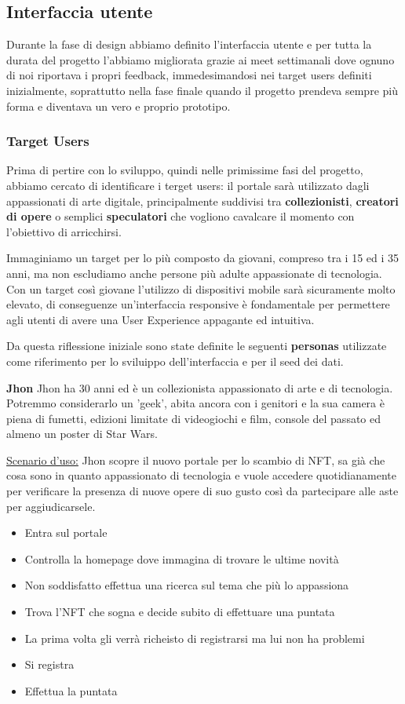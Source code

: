 \clearpage

\subsection{Interfaccia utente}
Durante la fase di design abbiamo definito l'interfaccia utente 
e per tutta la durata del progetto l'abbiamo migliorata grazie ai meet settimanali dove ognuno di noi riportava i propri feedback,
immedesimandosi nei target users definiti inizialmente,
soprattutto nella fase finale quando il progetto prendeva sempre più forma e diventava un vero e proprio prototipo.

\subsubsection{Target Users}
Prima di pertire con lo sviluppo, quindi nelle primissime fasi del progetto, abbiamo cercato di identificare i terget users:
il portale sarà utilizzato dagli appassionati di arte digitale, principalmente suddivisi tra \textbf{collezionisti}, \textbf{creatori di opere} 
o semplici \textbf{speculatori} che vogliono cavalcare il momento con l'obiettivo di arricchirsi.

Immaginiamo un target per lo più composto da giovani, compreso tra i 15 ed i 35 anni, ma non escludiamo anche persone più adulte appassionate di tecnologia.
Con un target così giovane l'utilizzo di dispositivi mobile sarà sicuramente molto elevato,
di conseguenze un'interfaccia responsive è fondamentale per permettere agli utenti di avere una User Experience appagante ed intuitiva. 

Da questa riflessione iniziale sono state definite le seguenti \textbf{personas} 
utilizzate come riferimento per lo sviluippo dell'interfaccia e per il seed dei dati.

\bigbreak
\noindent
\textbf{Jhon}
\bigbreak
\noindent
Jhon ha 30 anni ed è un collezionista appassionato di arte e di tecnologia. 
Potremmo considerarlo un 'geek', abita ancora con i genitori e la sua camera è piena di fumetti, 
edizioni limitate di videogiochi e film, console del passato ed almeno un poster di Star Wars.

\underline{Scenario d'uso:}
Jhon scopre il nuovo portale per lo scambio di NFT, 
sa già che cosa sono in quanto appassionato di tecnologia 
e vuole accedere quotidianamente per verificare la presenza di nuove opere di suo gusto
così da partecipare alle aste per aggiudicarsele.

\begin{itemize}
	\item Entra sul portale
	\item Controlla la homepage dove immagina di trovare le ultime novità
	\item Non soddisfatto effettua una ricerca sul tema che più lo appassiona
	\item Trova l'NFT che sogna e decide subito di effettuare una puntata
	\item La prima volta gli verrà richeisto di registrarsi ma lui non ha problemi 
	\item Si registra 
	\item Effettua la puntata
\end{itemize}

